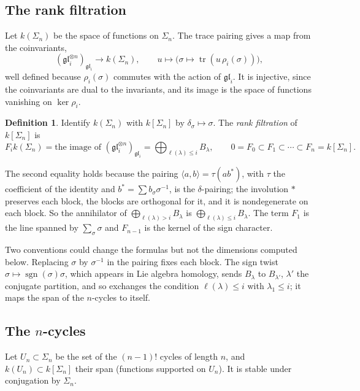 \documentclass[11pt,a4paper]{amsart}
\theoremstyle{definition}
\newtheorem{definition}[theorem]{Definition}
\theoremstyle{remark}
\newcommand{\gl}{\mathfrak{gl}}
\newcommand{\sgn}{\operatorname{sgn}}
\begin{document}
\subsection*{The rank filtration}
Let $k(\Sigma_n)$ be the space of functions on $\Sigma_n$. The trace pairing gives a map from the coinvariants,
\[
(\gl_i^{\otimes n})_{\gl_i} \to k(\Sigma_n), \qquad u \mapsto \bigl(\sigma \mapsto \operatorname{tr}(u\, \rho_i(\sigma))\bigr),
\]
well defined because $\rho_i(\sigma)$ commutes with the action of $\gl_i$. It is injective, since the coinvariants are dual to the invariants, and its image is the space of functions vanishing on $\ker \rho_i$.

\begin{definition}
Identify $k(\Sigma_n)$ with $k[\Sigma_n]$ by $\delta_\sigma \mapsto \sigma$. The \emph{rank filtration} of $k[\Sigma_n]$ is
\[
F_i k(\Sigma_n) = \text{the image of } (\gl_i^{\otimes n})_{\gl_i} = \bigoplus_{\ell(\lambda) \le i} B_\lambda, \qquad 0 = F_0 \subset F_1 \subset \cdots \subset F_n = k[\Sigma_n].
\]
\end{definition}

The second equality holds because the pairing $\langle a, b\rangle = \tau(a b^*)$, with $\tau$ the coefficient of the identity and $b^* = \sum b_\sigma \sigma^{-1}$, is the $\delta$-pairing; the involution $*$ preserves each block, the blocks are orthogonal for it, and it is nondegenerate on each block. So the annihilator of $\bigoplus_{\ell(\lambda) > i} B_\lambda$ is $\bigoplus_{\ell(\lambda) \le i} B_\lambda$. The term $F_1$ is the line spanned by $\sum_\sigma \sigma$ and $F_{n-1}$ is the kernel of the sign character.

Two conventions could change the formulas but not the dimensions computed below. Replacing $\sigma$ by $\sigma^{-1}$ in the pairing fixes each block. The sign twist $\sigma \mapsto \sgn(\sigma)\sigma$, which appears in Lie algebra homology, sends $B_\lambda$ to $B_{\lambda'}$, $\lambda'$ the conjugate partition, and so exchanges the condition $\ell(\lambda) \le i$ with $\lambda_1 \le i$; it maps the span of the $n$-cycles to itself.

\subsection*{The $n$-cycles}
Let $U_n \subset \Sigma_n$ be the set of the $(n-1)!$ cycles of length $n$, and $k(U_n) \subset k[\Sigma_n]$ their span (functions supported on $U_n$). It is stable under conjugation by $\Sigma_n$.
\end{document}
